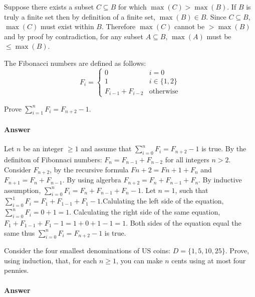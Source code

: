 \documentclass{article}
\begin{document}
Suppose there exists a subset $C \subseteq B$ for which $\max(C) > \max(B)$. If $B$ is truly a finite set then by definition of a finite set, $\max(B) \in B$. Since $C \subseteq B$, $\max(C)$ must exist within $B$. Therefore $\max(C)$ cannot be $> \max(B)$ and by proof by contradiction, for any subset $A \subseteq B$, $\max(A)$ must be $\leq \max(B)$.

\collab{\todo{}} 

The Fibonacci numbers are defined as follows:
$$
    F_i = \begin{cases}
		   0 & i=0\\
            1 & i \in \{1,2\} \\
            F_{i-1}+F_{i-2} & \text{otherwise}
          \end{cases}
$$

Prove $\sum_{i=1}^n F_i = F_{n+2}-1$.

\paragraph{Answer}

Let $n$ be an integer $\geq 1$ and assume that $\sum_{i=0}^n F_i = F_{n+2}-1$ is true. By the definiton of Fibonnaci numbers: $F_n =F_{n-1}+F_{n-2}$ for all integers $n>2$. Consider $F_{n+2}$, by the recursive formula $F{n+2}=F{n+1}+F_n$ and $F_{n+1} =F_n+F_{n-1}$. By using algerbra $F_{n+2}=F_n+F_{n-1}+F_n$. By inductive assumption, $\sum_{i=0}^n F_i = F_n+F_{n-1}+F_n-1$. Let $n=1$, such that $\sum_{i=0}^1 F_i = F_1+F_{1-1}+F_1-1$.Calulating the left side of the equation,  $\sum_{i=0}^n F_i =0+1=1$. Calculating the right side of the same equation,  $F_1+F_{1-1}+F_1-1= 1+0+1-1=1$. Both sides of the equation equal the same thus  $\sum_{i=0}^n F_i = F_{n+2}-1$ is true.

\collab{\todo{}} 

Consider the four smallest denominations of US coins: $D=\{1,5,10,25\}$.  Prove, using
induction, that, for each $n \geq 1$, you can make $n$ cents using at most four
pennies.

\paragraph{Answer}
\end{document}
